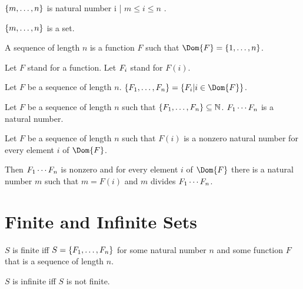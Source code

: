 \documentclass[11pt]{article}
\begin{document}
\begin{forthel}
\begin{definition}
  $\{m,\dots,n\}$ is { natural number i | $ m \leq i \leq n $ }.
\end{definition}

\begin{axiom} $\{m,\dots,n\}$ is a set. \end{axiom}

\begin{definition} A sequence of length $n$ is a
function $F$ such that $\Dom{F} = \Seq{1}{n}$.
\end{definition}

Let $F$ stand for a function.
Let $F_{i}$ stand for $F(i)$.

\begin{definition} Let $F$ be a sequence of length $n$.
$\Set{F}{1}{n} = \{ \val{F}{i} | i \in \Dom{F}\}$.
\end{definition}

\begin{signature} Let $F$ be a sequence of length $n$
such that $\{F_{1},\dots,F_{n}\} \subseteq \mathbb{N}$.
$F_{1} \cdots F_{n}$ is a natural number.
\end{signature}

\begin{axiom}[Factorproperty]
  Let $F$ be a sequence of length $n$
  such that $F(i)$ is a nonzero natural number for every element $i$ of $\Dom{F}$.

  Then $F_{1} \cdots F_{n}$ is nonzero and for every element $i$ of $\Dom{F}$
    there is a natural number $m$ such that $m = F(i)$ and $m$ divides $F_{1} \cdots F_{n}$.
\end{axiom}


\end{forthel}

\section{Finite and Infinite Sets}

\begin{forthel}

\begin{definition} $S$ is finite iff 
$S = \{F_{1},\dots,F_{n}\}$ for some natural number $n$ and some function $F$ that is 
a sequence of length $n$.
\end{definition}

\begin{definition} $S$ is infinite iff $S$ is not finite.
\end{definition}

\end{forthel}
\end{document}
